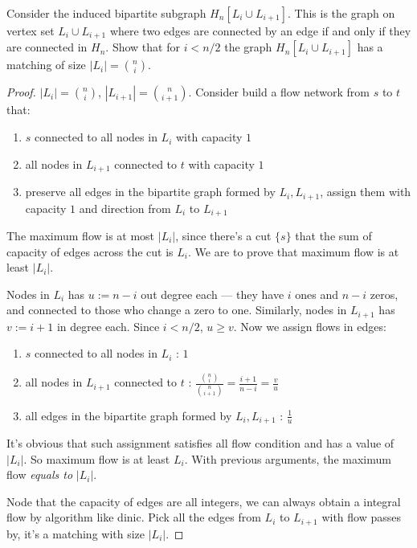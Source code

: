 \documentclass[11pt,a4paper,oneside]{article}
\begin{document}
\begin{problem}{4}
  \statement
  Consider the induced bipartite subgraph $H_n[ L_i \cup L_{i+1}]$. This is 
  the graph on vertex set $L_i \cup L_{i+1}$ where two edges are connected
  by an edge if and only if they are connected in $H_n$.
  Show that for $i < n/2$ the graph $H_n[ L_i \cup L_{i+1}]$
  has a matching of size $|L_i| = {n \choose i}$.
  
  \solution
  \begin{proof}
    $|L_i| = {n \choose i}$, $|L_{i + 1}| =  {n \choose {i + 1}}$. Consider build a flow network from $s$ to $t$ that:
    \begin{enumerate}
      \item $s$ connected to all nodes in $L_i$ with capacity $1$
      \item all nodes in $L_{i + 1}$ connected to $t$ with capacity $1$
      \item preserve all edges in the bipartite graph formed by $L_{i}, L_{i + 1}$, assign them with capacity $1$ and direction from $L_{i}$ to $L_{i + 1}$
    \end{enumerate}
    The maximum flow is at most $|L_{i}|$, since there's a cut $\{s\}$ that the sum of capacity of edges across the cut is $L_{i}$. We are to prove that maximum flow is at least $|L_{i}|$. 

    Nodes in $L_{i}$ has $u := n - i$ out degree each --- they have $i$ ones and $n - i$ zeros, and connected to those who change a zero to one. Similarly, nodes in $L_{i + 1}$ has $v := i + 1$ in degree each. Since $i < n / 2$, $u \geq v$. Now we assign flows in edges:
    \begin{enumerate}
      \item $s$ connected to all nodes in $L_i$ : $1$
      \item all nodes in $L_{i + 1}$ connected to $t$ : $\frac {{n \choose i}} {{n \choose {i + 1}}} = \frac {i + 1} {n - i} = \frac v u$
      \item all edges in the bipartite graph formed by $L_{i}, L_{i + 1}$ : $\frac 1 u$
    \end{enumerate}
 
    It's obvious that such assignment satisfies all flow condition and has a value of $|L_i|$. So maximum flow is at least $L_i$. With previous arguments, the maximum flow \textit{equals to} $|L_i|$.
 
    Node that the capacity of edges are all integers, we can always obtain a integral flow by algorithm like dinic. Pick all the edges from $L_{i}$ to $L_{i + 1}$ with flow passes by, it's a matching with size $|L_i|$.
    
  \end{proof}
\end{problem}
\end{document}
